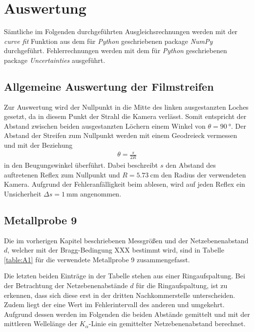 \section{Auswertung}
\label{sec:Auswertung}
Sämtliche im Folgenden durchgeführten Ausgleichsrechnungen werden mit der \emph{curve fit} Funktion aus dem für \emph{Python} geschriebenen package \emph{NumPy}\cite{scipy} durchgeführt. Fehlerrechnungen werden mit dem für \emph{Python} geschriebenen package \emph{Uncertainties}\cite{uncertainties} ausgeführt.

\subsection{Allgemeine Auswertung der Filmstreifen}
\label{sec:allgemein}
Zur Auswertung wird der Nullpunkt in die Mitte des linken ausgestanzten Loches gesetzt, da in diesem Punkt der Strahl die Kamera verlässt. Somit entspricht der Abstand zwischen beiden ausgestanzten Löchern einem Winkel von $\theta=\SI{90}{\degree}$. Der Abstand der Streifen zum Nullpunkt werden mit einem Geodreieck vermessen und mit der Beziehung
\begin{align}
	\theta=\frac{s}{2R}
\end{align}
in den Beugungswinkel überführt. Dabei beschreibt $s$ den Abstand des auftretenen Reflex zum Nullpunkt und $R=\SI{5.73}{\centi\meter}$ den Radius der verwendeten Kamera.  Aufgrund der Fehleranfälligkeit beim ablesen, wird auf jeden Reflex ein Unsicherheit  $\Delta s=\SI{1}{\milli\meter}$ angenommen.

\subsection{Metallprobe 9}
Die im vorherigen Kapitel beschriebenen Messgrößen und der Netzebenenabstand $d$, welcher mit der Bragg-Bedingung XXX bestimmt wird, sind in Tabelle \ref{table:A1} für die verwendete Metallprobe 9 zusammengefasst.

Die letzten beiden Einträge in der Tabelle stehen aus einer Ringaufspaltung. Bei der Betrachtung der Netzebenenabstände $d$ für die Ringaufspaltung, ist zu erkennen, dass sich diese erst in der dritten Nachkommerstelle unterscheiden. Zudem liegt der eine Wert im Fehlerintervall des anderen und umgekehrt. Aufgrund dessen werden im Folgenden die beiden Abstände gemittelt und mit der mittleren Wellelänge der $K_\alpha$-Linie ein gemittelter Netzebenenabstand berechnet. \\

